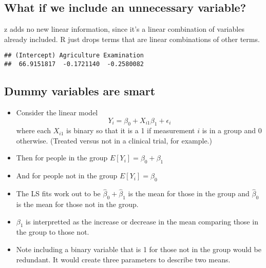 \documentclass[12pt,openright,oneside,a4paper,chapter=TITLE,section=TITLE,subsection=Title,english,french,spanish,portugues,sumario=tradicional]{04-class-files/abntex2}
\newenvironment{Shaded}{\begin{snugshade}}{\end{snugshade}}
\newcommand{\DataTypeTok}[1]{\textcolor[rgb]{0.13,0.29,0.53}{#1}}
\newcommand{\DecValTok}[1]{\textcolor[rgb]{0.00,0.00,0.81}{#1}}
\newcommand{\KeywordTok}[1]{\textcolor[rgb]{0.13,0.29,0.53}{\textbf{#1}}}
\newcommand{\NormalTok}[1]{#1}
\newcommand{\OperatorTok}[1]{\textcolor[rgb]{0.81,0.36,0.00}{\textbf{#1}}}
\newcommand{\StringTok}[1]{\textcolor[rgb]{0.31,0.60,0.02}{#1}}
\providecommand{\tightlist}{%
  \setlength{\itemsep}{0pt}\setlength{\parskip}{0pt}}
\begin{document}
\hypertarget{what-if-we-include-an-unnecessary-variable}{%
\subsection{What if we include an unnecessary variable?}\label{what-if-we-include-an-unnecessary-variable}}

z adds no new linear information, since it's a linear
combination of variables already included. R just drops
terms that are linear combinations of other terms.

\begin{Shaded}
\end{Shaded}

\begin{verbatim}
## (Intercept) Agriculture Examination 
##  66.9151817  -0.1721140  -0.2580082
\end{verbatim}

\hypertarget{dummy-variables-are-smart}{%
\subsection{Dummy variables are smart}\label{dummy-variables-are-smart}}

\begin{itemize}
\tightlist
\item
  Consider the linear model
  \[
  Y_i = \beta_0 + X_{i1} \beta_1 + \epsilon_{i}
  \]
  where each \(X_{i1}\) is binary so that it is a 1 if measurement \(i\) is in a group and 0 otherwise. (Treated versus not in a clinical trial, for example.)
\item
  Then for people in the group \(E[Y_i] = \beta_0 + \beta_1\)
\item
  And for people not in the group \(E[Y_i] = \beta_0\)
\item
  The LS fits work out to be \(\hat \beta_0 + \hat \beta_1\) is the mean for those in the group and \(\hat \beta_0\) is the mean for those not in the group.
\item
  \(\beta_1\) is interpretted as the increase or decrease in the mean comparing those in the group to those not.
\item
  Note including a binary variable that is 1 for those not in the group would be redundant. It would create three parameters to describe two means.
\end{itemize}
\end{document}
